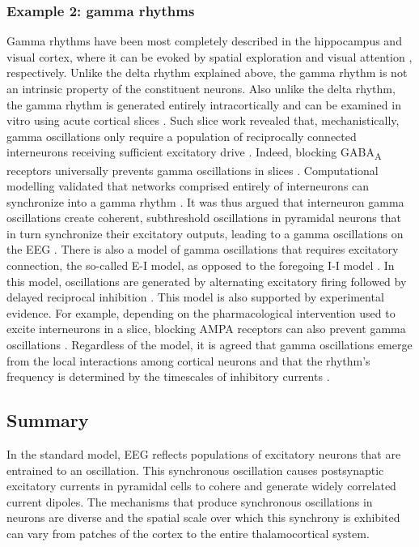 \subsubsection{Example 2: gamma rhythms}
 Gamma rhythms have been most completely described in the hippocampus and visual cortex, where it can be evoked by spatial exploration \cite{Bragin1995} and visual attention \cite{Gray1989}, respectively. Unlike the delta rhythm explained above, the gamma rhythm is not an intrinsic property of the constituent neurons. Also unlike the delta rhythm, the gamma rhythm is generated entirely intracortically \cite{Gray1989} and can be examined in vitro using acute cortical slices \cite{Whittington1995}. Such slice work revealed that, mechanistically, gamma oscillations only require a population of reciprocally connected interneurons receiving sufficient excitatory drive \cite{Whittington1995, Buzski2012b}. Indeed, blocking GABA\textsubscript{A} receptors universally prevents gamma oscillations in slices \cite{Bartos2007}. Computational modelling validated that networks comprised entirely of interneurons can synchronize into a gamma rhythm \cite{Wang1996}. It was thus argued that interneuron gamma oscillations create coherent, subthreshold oscillations in pyramidal neurons that in turn synchronize their excitatory outputs, leading to a gamma oscillations on the EEG \cite{Wang1996}. There is also a model of gamma oscillations that requires excitatory connection, the so-called E-I model, as opposed to the foregoing I-I model \cite{Buzski2012b}. In this model, oscillations are generated by alternating excitatory firing followed by delayed reciprocal inhibition \cite{Borgers2003}. This model is also supported by experimental evidence. For example, depending on the pharmacological intervention used to excite interneurons in a slice, blocking AMPA receptors can also prevent gamma oscillations \cite{Bartos2007}. Regardless of the model, it is agreed that gamma oscillations emerge from the local interactions among cortical neurons and that the rhythm's frequency is determined by the timescales of inhibitory currents \cite{Bartos2007, Buzski2012b}.

\subsection{Summary}
In the standard model, EEG reflects populations of excitatory neurons that are entrained to an oscillation. This synchronous oscillation causes postsynaptic excitatory currents in pyramidal cells to cohere and generate widely correlated current dipoles. The mechanisms that produce synchronous oscillations in neurons are diverse and the spatial scale over which this synchrony is exhibited can vary from patches of the cortex to the entire thalamocortical system. 

